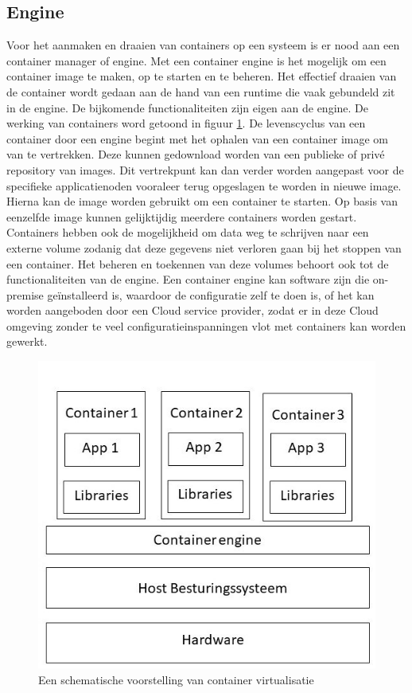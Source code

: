\subsection{Engine}

Voor het aanmaken en draaien van containers op een systeem is er nood aan een container manager of engine. Met een container engine is het mogelijk om een container image te maken, op te starten en te beheren. Het effectief draaien van de container wordt gedaan aan de hand van een runtime die vaak gebundeld zit in de engine. De bijkomende functionaliteiten zijn eigen aan de engine. De werking van containers word getoond in figuur \ref{fig:Containers}. De levenscyclus van een container door een engine begint met het ophalen van een container image om van te vertrekken. Deze kunnen gedownload worden van een publieke of privé repository van images. Dit vertrekpunt kan dan verder worden aangepast voor de specifieke applicatienoden vooraleer terug opgeslagen te worden in nieuwe image. Hierna kan de image worden gebruikt om een container te starten. Op basis van eenzelfde image kunnen gelijktijdig meerdere containers worden gestart. Containers hebben ook de mogelijkheid om data weg te schrijven naar een externe volume zodanig dat deze gegevens niet verloren gaan bij het stoppen van een container. Het beheren en toekennen van deze volumes behoort ook tot de functionaliteiten van de engine. Een container engine kan software zijn die on-premise geïnstalleerd is, waardoor de configuratie zelf te doen is, of het kan worden aangeboden door een Cloud service provider, zodat er in deze Cloud omgeving zonder te veel configuratieinspanningen vlot met containers kan worden gewerkt\autocite{Casalicchio2020}.
\begin{figure}[h]
    \includegraphics[width=\linewidth]{img/container.jpg}
    \caption[Schema container virtualisatie]{Een schematische voorstelling van container virtualisatie}
    \label{fig:Containers}
    \centering
\end{figure}


